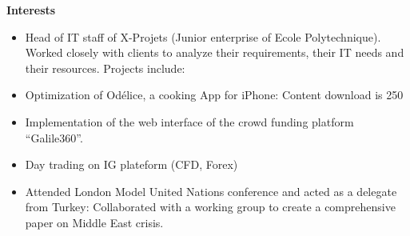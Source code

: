 \documentclass[letterpaper,11pt]{article}
\newcommand{\resheading}[1]{\begin{mdframed}[backgroundcolor=blue!20] \bf{#1}  \end{mdframed}}
\begin{document}
\resheading{Interests}

\begin{itemize}
\item Head of IT staff of X-Projets (Junior enterprise of Ecole Polytechnique).  Worked closely with clients to analyze their requirements, their IT needs and their resources. Projects include: 
\item Optimization of Odélice, a cooking App for iPhone: Content download is 250%
\item Implementation of the web interface of the crowd funding platform “Galile360”.
\item Day trading on IG plateform (CFD, Forex)
\item Attended London Model United Nations conference and acted as a delegate from Turkey: Collaborated with a working group to create a comprehensive paper on Middle East crisis.
\end{itemize}
\end{document}
